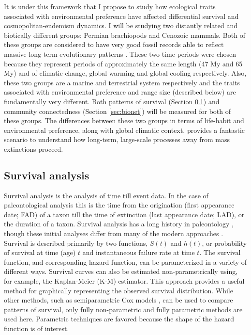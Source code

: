 \documentclass[12pt,letterpaper]{article}
\begin{document}
It is under this framework that I propose to study how ecological traits associated with environmental preference have affected differential survival and cosmopolitan-endemism dynamics. I will be studying two distantly related and biotically different groups: Permian brachiopods and Cenozoic mammals. Both of these groups are considered to have very good fossil records able to reflect massive long term evolutionary patterns \citep{Mark1977}. These two time periods were chosen because they represent periods of approximately the same length (47 My and 65 My) and of climatic change, global warming and global cooling respectively. Also, these two groups are a marine and terrestrial system respectively and the traits associated with environmental preference and range size (described below) are fundamentally very different. Both patterns of survival (Section \ref{sec:surv}) and community connectedness (Section \ref{sec:bionet}) will be measured for both of these groups. The differences between these two groups in terms of life-habit and environmental preference, along with global climatic context, provides a fantastic scenario to understand how long-term, large-scale processes away from mass extinctions proceed.


\subsection{Survival analysis} \label{sec:surv}
Survival analysis is the analysis of time till event data. In the case of paleontological analysis this is the time from the origination (first appearance date; FAD) of a taxon till the time of extinction (last appearance date; LAD), or the duration of a taxon. Survival analysis has a long history in paleontology \citep{Simpson1944,VanValen1973}, though these initial analyses differ from many of the modern approaches \citep{Kleinbaum2005}. Survival is described primarily by two functions, \(S(t)\) and \(h(t)\), or probability of survival at time (age) \(t\) and instantaneous failure rate at time \(t\). The survival function, and corresponding hazard function, can be parameterized in a variety of different ways. Survival curves can also be estimated non-parametrically using, for example, the Kaplan-Meier (K-M) estimator. This approach provides a useful method for graphically representing the observed survival distribution. While other methods, such as semiparametric Cox models \citep{Kleinbaum2005}, can be used to compare patterns of survival, only fully non-parametric and fully parametric methods are used here. Parametric techniques are favored because the shape of the hazard function is of interest.
\end{document}
